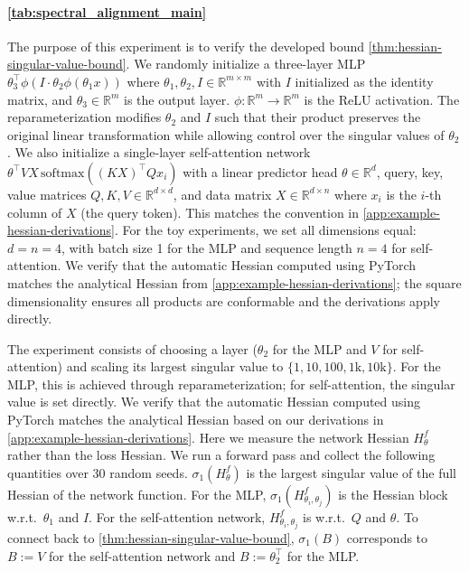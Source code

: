 \documentclass{article}
\theoremstyle{plain}
\theoremstyle{definition}
\theoremstyle{remark}
\begin{document}
\paragraph{\cref{tab:spectral_alignment_main}} The purpose of this experiment is to verify the developed bound \cref{thm:hessian-singular-value-bound}. We randomly initialize a three-layer MLP $\theta_3^{\top}\phi(I \cdot \theta_2\phi(\theta_1x))$ where $\theta_1, \theta_2, I \in \mathbb{R}^{m \times m}$ with $I$ initialized as the identity matrix, and $\theta_3 \in \mathbb{R}^{m}$ is the output layer. $\phi: \mathbb{R}^m \to \mathbb{R}^m$ is the ReLU activation. The reparameterization modifies $\theta_2$ and $I$ such that their product preserves the original linear transformation while allowing control over the singular values of $\theta_2$. We also initialize a single-layer self-attention network $\theta^{\top}VX\,\mathrm{softmax}((KX)^{\top}Qx_i)$ with a linear predictor head $\theta \in \mathbb{R}^{d}$, query, key, value matrices $Q, K, V \in \mathbb{R}^{d \times d}$, and data matrix $X \in \mathbb{R}^{d \times n}$ where $x_i$ is the $i$-th column of $X$ (the query token). This matches the convention in \cref{app:example-hessian-derivations}. For the toy experiments, we set all dimensions equal: $d = n = 4$, with batch size 1 for the MLP and sequence length $n=4$ for self-attention. We verify that the automatic Hessian computed using PyTorch matches the analytical Hessian from \cref{app:example-hessian-derivations}; the square dimensionality ensures all products are conformable and the derivations apply directly.

The experiment consists of choosing a layer ($\theta_2$ for the MLP and $V$ for self-attention) and scaling its largest singular value to $\{1, 10, 100, 1\mathrm{k}, 10\mathrm{k}\}$. For the MLP, this is achieved through reparameterization; for self-attention, the singular value is set directly. We verify that the automatic Hessian computed using PyTorch matches the analytical Hessian based on our derivations in \cref{app:example-hessian-derivations}. Here we measure the network Hessian $H^f_{\theta}$ rather than the loss Hessian. We run a forward pass and collect the following quantities over 30 random seeds. $\sigma_1(H_{\theta}^f)$ is the largest singular value of the full Hessian of the network function. For the MLP, $\sigma_1(H^{f}_{\theta_i,\theta_j})$ is the Hessian block w.r.t.\ $\theta_1$ and $I$. For the self-attention network, $H^{f}_{\theta_i,\theta_j}$ is w.r.t.\ $Q$ and $\theta$. To connect back to \cref{thm:hessian-singular-value-bound}, $\sigma_1(B)$ corresponds to $B := V$ for the self-attention network and $B := \theta_2^{\top}$ for the MLP. 
\end{document}
